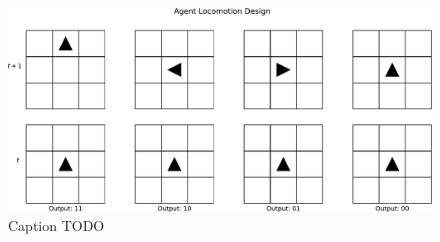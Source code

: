 \begin{figure}[!htbp]
\begin{center}
\includegraphics[width=\textwidth]{img/movement_explanatory}
\caption{
Caption TODO
}
\label{fig:movement_explanatory}
\end{center}
\end{figure}
